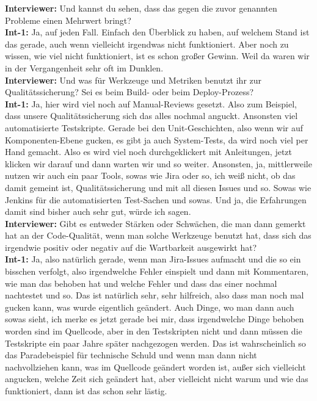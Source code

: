 \textbf{Interviewer:} Und kannst du sehen, dass das gegen die zuvor genannten Probleme einen Mehrwert bringt?\\
\textbf{Int-1:} Ja, auf jeden Fall. Einfach den Überblick zu haben, auf welchem Stand ist das gerade, auch wenn vielleicht irgendwas nicht funktioniert. Aber noch zu wissen, wie viel nicht funktioniert, ist es schon großer Gewinn. Weil da waren wir in der Vergangenheit sehr oft im Dunklen.\\
\textbf{Interviewer:} Und was für Werkzeuge und Metriken benutzt ihr zur Qualitätssicherung? Sei es beim Build- oder beim Deploy-Prozess?\\
\textbf{Int-1:} Ja, hier wird viel noch auf Manual-Reviews gesetzt. Also zum Beispiel, dass unsere Qualitätssicherung sich das alles nochmal anguckt. Ansonsten viel automatisierte Testskripte. Gerade bei den Unit-Geschichten, also wenn wir auf Komponenten-Ebene gucken, es gibt ja auch System-Tests, da wird noch viel per Hand gemacht. Also es wird viel noch durchgeklickert mit Anleitungen, jetzt klicken wir darauf und dann warten wir und so weiter. Ansonsten, ja, mittlerweile nutzen wir auch ein paar Tools, sowas wie Jira oder so, ich weiß nicht, ob das damit gemeint ist, Qualitätssicherung und mit all diesen Issues und so. Sowas wie Jenkins für die automatisierten Test-Sachen und sowas. Und ja, die Erfahrungen damit sind bisher auch sehr gut, würde ich sagen.\\
\textbf{Interviewer:} Gibt es entweder Stärken oder Schwächen, die man dann gemerkt hat an der Code-Qualität, wenn man solche Werkzeuge benutzt hat, dass sich das irgendwie positiv oder negativ auf die Wartbarkeit ausgewirkt hat?\\
\textbf{Int-1:} Ja, also natürlich gerade, wenn man Jira-Issues aufmacht und die so ein bisschen verfolgt, also irgendwelche Fehler einspielt und dann mit Kommentaren, wie man das behoben hat und welche Fehler und dass das einer nochmal nachtestet und so. Das ist natürlich sehr, sehr hilfreich, also dass man noch mal gucken kann, was wurde eigentlich geändert. Auch Dinge, wo man dann auch sowas sieht, ich merke es jetzt gerade bei mir, dass irgendwelche Dinge behoben worden sind im Quellcode, aber in den Testskripten nicht und dann müssen die Testskripte ein paar Jahre später nachgezogen werden. Das ist wahrscheinlich so das Paradebeispiel für technische Schuld und wenn man dann nicht nachvollziehen kann, was im Quellcode geändert worden ist, außer sich vielleicht angucken, welche Zeit sich geändert hat, aber vielleicht nicht warum und wie das funktioniert, dann ist das schon sehr lästig.\\

